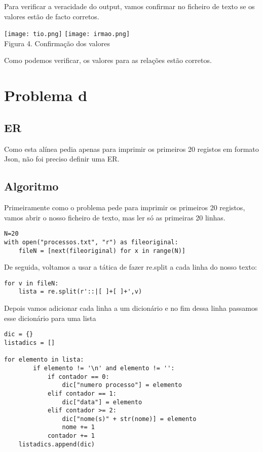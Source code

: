 \documentclass[11pt,a4paper]{report}%
\begin{document}
Para verificar a veracidade do output, vamos confirmar no ficheiro de texto se os valores estão de facto corretos.
\begin{center}
    \texttt{[image: tio.png]}
    \texttt{[image: irmao.png]}
    \\
    \caption{Figura 4. Confirmação dos valores}
\end{center}

Como podemos verificar, os valores para as relações estão corretos.

\newpage

\section{Problema d}

\subsection{ER}

Como esta alínea pedia apenas para imprimir os primeiros 20 registos em formato Json, não foi preciso definir uma ER.

\subsection{Algoritmo}

Primeiramente como o problema pede para imprimir os primeiros 20 registos, vamos abrir o nosso ficheiro de texto, mas ler só as primeiras 20 linhas.

\begin{verbatim}
N=20
with open("processos.txt", "r") as fileoriginal:
    fileN = [next(fileoriginal) for x in range(N)]
\end{verbatim}

De seguida, voltamos a usar a tática de fazer re.split a cada linha do nosso texto:

\begin{verbatim}
for v in fileN: 
    lista = re.split(r'::|[ ]+[ ]+',v)
\end{verbatim}

Depois vamos adicionar cada linha a um dicionário e no fim dessa linha passamos esse dicionário para uma lista
\begin{verbatim}
dic = {}
listadics = []

for elemento in lista: 
        if elemento != '\n' and elemento != '': 
            if contador == 0: 
                dic["numero processo"] = elemento
            elif contador == 1: 
                dic["data"] = elemento
            elif contador >= 2: 
                dic["nome(s)" + str(nome)] = elemento
                nome += 1
            contador += 1
    listadics.append(dic)
\end{verbatim}
\end{document}
